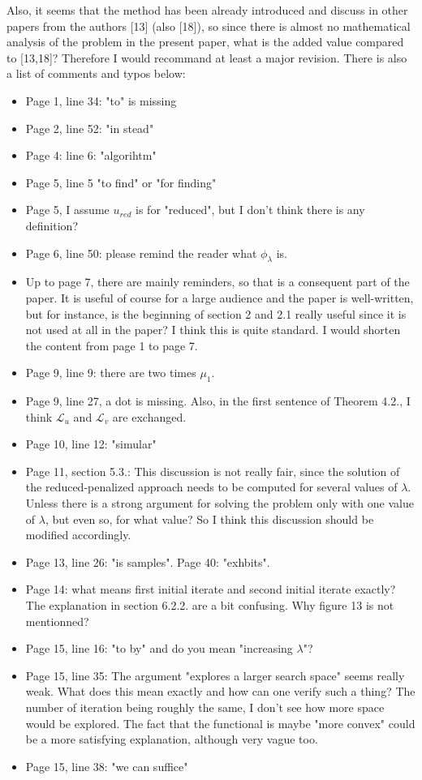 \documentclass[12pt]{article}
\begin{document}
Also, it seems that the method has been already introduced and discuss in other papers from the authors [13] (also [18]), so since there is almost no mathematical analysis of the problem in the present paper, what is the added value compared to [13,18]? 
Therefore I would recommand at least a major revision. There is also a list of comments and typos below: 
\begin{itemize} 
\item Page 1, line 34: "to" is missing 
\item Page 2, line 52: "in stead" 
\item Page 4: line 6: "algorihtm" 
\item Page 5, line 5 "to find" or "for finding" 
\item Page 5, I assume $u_{red}$ is for "reduced", but I don't think there is any definition? 
\item Page 6, line 50: please remind the reader what $\phi_\lambda$ is. 
\item Up to page 7, there are mainly reminders, so that is a consequent part of the paper. It is useful of course for a large audience and the paper is well-written, but for instance, is the beginning of section 2 and 2.1 really useful since it is not used at all in the paper? I think this is quite standard. I would shorten the content from page 1 to page 7. 
\item Page 9, line 9: there are two times $\mu_1$. 
\item Page 9, line 27, a dot is missing. Also, in the first sentence of Theorem 4.2., I think $\mathcal L_u$ and $\mathcal L_v$ are exchanged. 
\item Page 10, line 12: "simular" 
\item Page 11, section 5.3.: This discussion is not really fair, since the solution of the reduced-penalized approach needs to be computed for several values of $\lambda$. Unless there is a strong argument for solving the problem only with one value of $\lambda$, but even so, for what value? So I think this discussion should be modified accordingly. 
\item Page 13, line 26: "is samples". Page 40: "exhbits". 
\item Page 14: what means first initial iterate and second initial iterate exactly? The explanation in section 6.2.2. are a bit confusing. Why figure 13 is not mentionned? 
\item Page 15, line 16: "to by" and do you mean "increasing $\lambda$"? 
\item Page 15, line 35: The argument "explores a larger search space" seems really weak. What does this mean exactly and how can one verify such a thing? The number of iteration being roughly the same, I don't see how more space would be explored. The fact that the functional is maybe "more convex" could be a more satisfying explanation, although very vague too. 
\item Page 15, line 38: "we can suffice" 
\end{itemize} 
\end{document}
